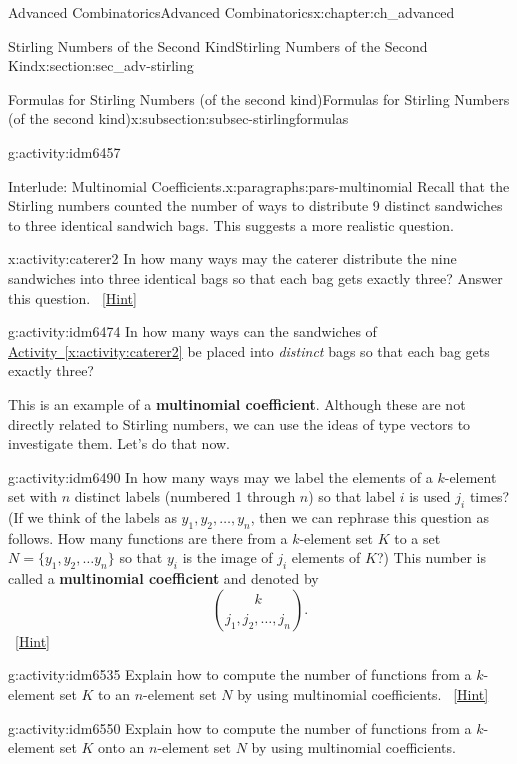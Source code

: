 \documentclass[oneside,10pt,]{book}
\newcommand{\terminology}[1]{\textbf{#1}}
\numberwithin{equation}{chapter}
\begin{document}
\begin{chapterptx}{Advanced Combinatorics}{}{Advanced Combinatorics}{}{}{x:chapter:ch_advanced}
\begin{sectionptx}{Stirling Numbers of the Second Kind}{}{Stirling Numbers of the Second Kind}{}{}{x:section:sec_adv-stirling}
\begin{subsectionptx}{Formulas for Stirling Numbers (of the second kind)}{}{Formulas for Stirling Numbers (of the second kind)}{}{}{x:subsection:subsec-stirlingformulas}
\begin{activity}{}{g:activity:idm6457}
\end{activity}
\begin{paragraphs}{Interlude: Multinomial Coefficients.}{x:paragraphs:pars-multinomial}%
Recall that the Stirling numbers counted the number of ways to distribute 9 distinct sandwiches to three identical sandwich bags.  This suggests a more realistic question.%
\begin{activity}{}{x:activity:caterer2}%
In how many ways may the caterer distribute the nine sandwiches into three identical bags so that each bag gets exactly three? Answer this question.%
\qquad~\hfill{\tiny\hyperlink{g:hint:idm6468-back}{[Hint]}}\end{activity}
\begin{activity}{}{g:activity:idm6474}%
In how many ways can the sandwiches of \hyperref[x:activity:caterer2]{Activity~\ref{x:activity:caterer2}} be placed into \emph{distinct} bags so that each bag gets exactly three?%
\end{activity}
This is an example of a \terminology{multinomial coefficient}.  Although these are not directly related to Stirling numbers, we can use the ideas of type vectors to investigate them.  Let's do that now.%
\begin{activity}{}{g:activity:idm6490}%
In how many ways may we label the elements of a \(k\)-element set with \(n\) distinct labels (numbered 1 through \(n\)) so that label \(i\) is used \(j_i\) times? (If we think of the labels as \(y_1, y_2, \ldots, y_n\), then we can rephrase this question as follows.  How many functions are there from a \(k\)-element set \(K\) to a set \(N=\{y_1,y_2,\ldots y_n\}\) so that \(y_i\) is the image of \(j_i\) elements of \(K\)?) This number is called a \terminology{multinomial coefficient} and denoted by%
\begin{equation*}
\binom{k}{j_1,j_2,\ldots, j_n}.
\end{equation*}
%
\qquad~\hfill{\tiny\hyperlink{g:hint:idm6512-back}{[Hint]}}\end{activity}
\begin{activity}{}{g:activity:idm6535}%
Explain how to compute the number of functions from a \(k\)-element set \(K\) to an \(n\)-element set \(N\) by using multinomial coefficients.%
\qquad~\hfill{\tiny\hyperlink{g:hint:idm6542-back}{[Hint]}}\end{activity}
\begin{activity}{}{g:activity:idm6550}%
Explain how to compute the number of functions from a \(k\)-element set \(K\) onto an \(n\)-element set \(N\) by using multinomial coefficients.%

\end{activity}
\end{paragraphs}
\end{subsectionptx}
\end{sectionptx}
\end{chapterptx}
\end{document}
